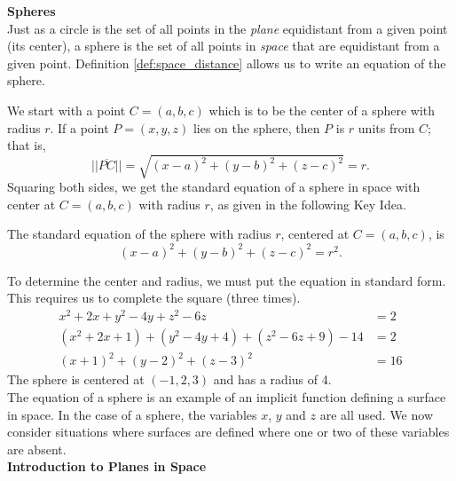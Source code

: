 \noindent\textbf{\large Spheres}\\

Just as a circle is the set of all points in the \textit{plane} equidistant from a given point (its center), a sphere is the set of all points in \textit{space} that are equidistant from a given point. Definition \ref{def:space_distance} allows us to write an equation of the sphere.

We start with a point $C = (a,b,c)$ which is to be the center of a sphere with radius $r$. If a point $P=(x,y,z)$ lies on the sphere, then $P$ is $r$ units from $C$; that is, 
$$||\overline{PC}|| = \sqrt{(x-a)^2+(y-b)^2+(z-c)^2} = r.$$
Squaring both sides, we get the standard equation of a sphere in space with center at $C=(a,b,c)$ with radius $r$, as given in the following Key Idea.

{The standard equation of the sphere with radius $r$, centered at $C=(a,b,c)$, is
$$(x-a)^2+(y-b)^2+(z-c)^2=r^2.$$
}

{To determine the center and radius, we must put the equation in standard form. This requires us to complete the square (three times).
\begin{align*}
x^2+2x+y^2-4y+z^2-6z&=2 \\
(x^2+2x+1) + (y^2-4y+4)+ (z^2-6z+9) - 14 &= 2\\
(x+1)^2 + (y-2)^2 + (z-3)^2 &= 16
\end{align*}
The sphere is centered at $(-1,2,3)$ and has a radius of 4.
}\\

The equation of a sphere is an example of an implicit function defining a surface in space. In the case of a sphere, the variables $x$, $y$ and $z$ are all used. We now consider situations where surfaces are defined where one or two of these variables are absent.\\

\noindent\textbf{\large Introduction to Planes in Space}\\

